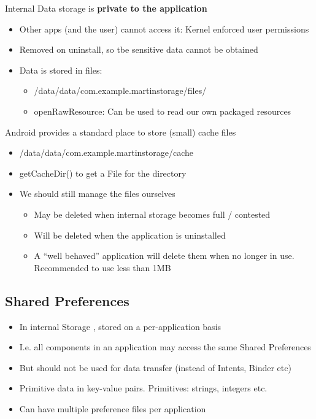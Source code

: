 \documentclass{article}
\begin{document}
\begin{flushleft}
Internal	Data	storage	is	\textbf{private	to	the	application}
\begin{itemize}
  \item Other apps (and the user) cannot access it: Kernel enforced user permissions
  \item Removed	on	uninstall, so tbe sensitive data cannot be obtained
  \item Data is stored in files:
  \begin{itemize}
    \item /data/data/com.example.martinstorage/files/
    \item openRawResource: Can be used to read our own packaged resources
  \end{itemize}
\end{itemize}
Android provides a standard place to store (small) cache files
\begin{itemize}
  \item /data/data/com.example.martinstorage/cache
  \item getCacheDir() to get a File for the directory
  \item We should still manage the files ourselves
  \begin{itemize}
    \item May be deleted when internal storage becomes full / contested
    \item Will be deleted when the application is uninstalled 
    \item A “well behaved” application will delete them when no longer in use. Recommended to use less than 1MB
  \end{itemize}
\end{itemize}
\end{flushleft}

\subsection{Shared Preferences}

\begin{itemize}
  \item In internal Storage , stored on a per-application basis 
  \item I.e. all components in an application may access the same Shared Preferences 
  \item But should not be used for data transfer (instead of Intents, Binder etc) 
  \item Primitive data in key-value pairs. Primitives: strings, integers etc.
  \item Can have multiple preference files per application
\end{itemize}
\end{document}
